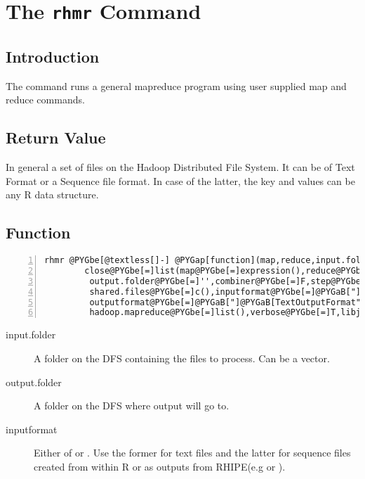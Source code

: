 \documentclass[letterpaper,10pt,english]{manual}
\begin{document}
\resetcurrentobjects
\hypertarget{--doc-rhmr}{}

\chapter{The \texttt{rhmr} Command}


\section{Introduction}

The  command runs a general mapreduce program using user supplied map
and reduce commands.


\section{Return Value}

In general a set of files on the Hadoop Distributed File System. It can be of
Text Format or a Sequence file format. In case of the latter, the key and values
can be any R data structure.


\section{Function}

\begin{Verbatim}[commandchars=@\[\],numbers=left,firstnumber=1,stepnumber=1]
rhmr @PYGbe[@textless[]-] @PYGap[function](map,reduce,input.folder,configure@PYGbe[=]list(map@PYGbe[=]expression(),reduce@PYGbe[=]expression()),
        close@PYGbe[=]list(map@PYGbe[=]expression(),reduce@PYGbe[=]expression())
         output.folder@PYGbe[=]'',combiner@PYGbe[=]F,step@PYGbe[=]F,
         shared.files@PYGbe[=]c(),inputformat@PYGbe[=]@PYGaB["]@PYGaB[TextInputFormat"],
         outputformat@PYGbe[=]@PYGaB["]@PYGaB[TextOutputFormat"],
         hadoop.mapreduce@PYGbe[=]list(),verbose@PYGbe[=]T,libjars@PYGbe[=]c())
\end{Verbatim}
\begin{description}
\item[input.folder]
A folder on the DFS containing the files to process. Can be a vector.

\item[output.folder]
A folder on the DFS where output will go to.

\item[inputformat]
Either of  or . Use the former
for text files and the latter for sequence files created from within R or as
outputs from RHIPE(e.g  or ).

\end{description}
\end{document}
